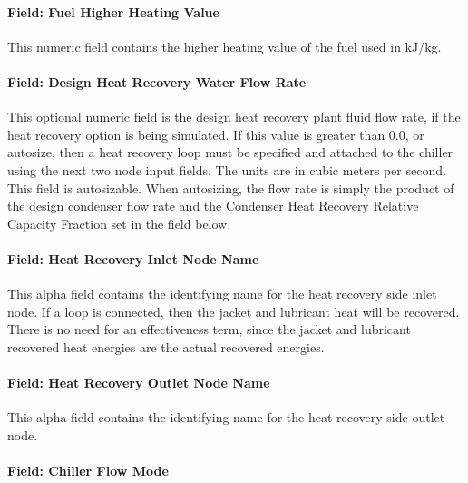 \paragraph{Field: Fuel Higher Heating Value}\label{field-fuel-higher-heating-value-000}

This numeric field contains the higher heating value of the fuel used in kJ/kg.

\paragraph{Field: Design Heat Recovery Water Flow Rate}\label{field-design-heat-recovery-water-flow-rate-3}

This optional numeric field is the design heat recovery plant fluid flow rate, if the heat recovery option is being simulated. If this value is greater than 0.0, or autosize, then a heat recovery loop must be specified and attached to the chiller using the next two node input fields. The units are in cubic meters per second. This field is autosizable. When autosizing, the flow rate is simply the product of the design condenser flow rate and the Condenser Heat Recovery Relative Capacity Fraction set in the field below.

\paragraph{Field: Heat Recovery Inlet Node Name}\label{field-heat-recovery-inlet-node-name-3}

This alpha field contains the identifying name for the heat recovery side inlet node. If a loop is connected, then the jacket and lubricant heat will be recovered. There is no need for an effectiveness term, since the jacket and lubricant recovered heat energies are the actual recovered energies.

\paragraph{Field: Heat Recovery Outlet Node Name}\label{field-heat-recovery-outlet-node-name-3}

This alpha field contains the identifying name for the heat recovery side outlet node.

\paragraph{Field: Chiller Flow Mode}\label{field-chiller-flow-mode-5}

